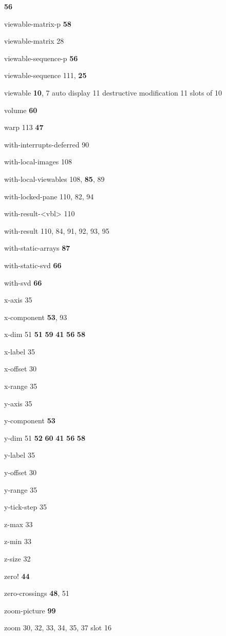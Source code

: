 \begin{theindex}
 {\bf 56}
\item {\ptt viewable-matrix-p} {\bf 58}
\item {\ptt viewable-matrix} 28
\item {\ptt viewable-sequence-p} {\bf 56}
\item {\ptt viewable-sequence} 111, {\bf 25}
\item {\ptt viewable} {\bf 10}, 7
\subitem auto display 11
\subitem destructive modification 11
\subitem slots of 10
\item {\ptt volume} {\bf 60}
\item {\ptt warp} 113
 {\bf 47}
\item {\ptt with-interrupts-deferred} 90
\item {\ptt with-local-images} 108
\item {\ptt with-local-viewables} 108, {\bf 85}, 89
\item {\ptt with-locked-pane} 110, 82, 94
\item {\ptt with-result-<vbl>} 110
\item {\ptt with-result} 110, 84, 91, 92, 93, 95
\item {\ptt with-static-arrays} {\bf 87}
\item {\ptt with-static-svd} {\bf 66}
\item {\ptt with-svd} {\bf 66}
\item {\ptt x-axis} 35
\item {\ptt x-component} {\bf 53}, 93
\item {\ptt x-dim} 51
 {\bf 51}
 {\bf 59}
 {\bf 41}
 {\bf 56}
 {\bf 58}
\item {\ptt x-label} 35
\item {\ptt x-offset} 30
\item {\ptt x-range} 35
\item {\ptt y-axis} 35
\item {\ptt y-component} {\bf 53}
\item {\ptt y-dim} 51
 {\bf 52}
 {\bf 60}
 {\bf 41}
 {\bf 56}
 {\bf 58}
\item {\ptt y-label} 35
\item {\ptt y-offset} 30
\item {\ptt y-range} 35
\item {\ptt y-tick-step} 35
\item {\ptt z-max} 33
\item {\ptt z-min} 33
\item {\ptt z-size} 32
\item {\ptt zero!}
 {\bf 44}
\item {\ptt zero-crossings} {\bf 48}, 51
\item {\ptt zoom-picture} {\bf 99}
\item {\ptt zoom} 30, 32, 33, 34, 35, 37
\subitem slot 16

\end{theindex}
